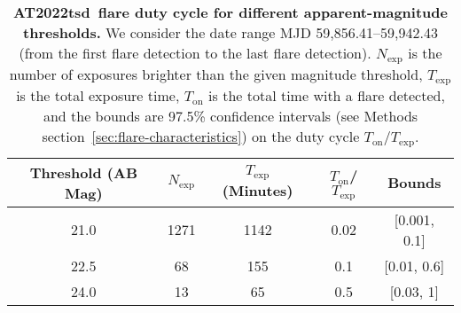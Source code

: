 \documentclass{nature_plusfigure}
\newcommand{\at}{AT2022tsd}
\begin{document}
\begin{extended_data}
\begin{table}
\begin{center}
\caption{\textbf{\at\ flare duty cycle for different apparent-magnitude thresholds.} We consider the date range MJD 59,856.41--59,942.43 (from the first flare detection to the last flare detection). $N_\mathrm{exp}$ is the number of exposures brighter than the given magnitude threshold, $T_\mathrm{exp}$ is the total exposure time, $T_\mathrm{on}$ is the total time with a flare detected, and the bounds are 97.5\% confidence intervals (see Methods section~\ref{sec:flare-characteristics}) on the duty cycle $T_\mathrm{on}/T_\mathrm{exp}$. }
\label{tab:flare-stats}
\begin{tabular}{ccccc} 
\hline\hline
Threshold (AB Mag) & $N_\mathrm{exp}$ & $T_\mathrm{exp}$ (Minutes) & $T_\mathrm{on}$/$T_\mathrm{exp}$ & Bounds \\
\hline
21.0 & 1271 & 1142 & 0.02 & [0.001, 0.1] \\
22.5 & 68 & 155 & 0.1 & [0.01, 0.6]  \\
24.0 & 13 & 65 & 0.5 & [0.03, 1] \\
\hline
\end{tabular}
\end{center}
\end{table}


\end{extended_data}

\clearpage
\end{document}
